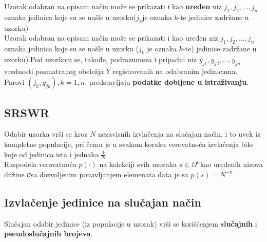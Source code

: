 \documentclass[10pt,a4paper,]{article}
\begin{document}
Uzorak odabran na opisani način može se prikazati i 
kao \textbf{uređen} niz $j_1, j_2,..., j_n$oznaka jedinica koje su se našle u 
uzorku($j_k$je oznaka $k$-te jedinice zadržane u uzorku)
\\

Uzorak odabran na opisani način može se prikazati i kao uređen niz 
$j_1,j_2,...,j_n$ oznaka jedinica koje su se našle u uzorku
($j_k$ je oznaka $k$-te) 
jedinice zadržane u uzorku).Pod uzorkom se, takođe, podrazumeva i 
pripadni niz $y_{j1},y_{j2},...,y_{jn}$vrednosti posmatranog obeležja 
$Y$ registrovanih na odabranim jedinicama.
\\

Parovi $(j_k,y_{jk}), k=\overline{1,𝑛}$, predstavljaju 
\textbf{podatke dobijene u 
istraživanju}.

\subsection{SRSWR}
\textbullet	Odabir uzorka vrši se kroz $N$ nezavisnih izvlačenja na 
slučajan način, i to uvek iz kompletne populacije, pri čemu je u 
svakom koraku verovatnoća izvlačenja bilo koje od jedinica ista i 
jednaka $\frac{1}{N}$.
\\
\textbullet 
Raspodela verovatnoća $p(\cdot)$ na kolekciji svih uzoraka
$s \in \Omega^n$kao 
uređenih 
nizova dužine 𝑛sa dozvoljenim ponavljanjem elemenata data je sa
$p(s) = N^{-n}$

\subsection{Izvlačenje jedinice na slučajan način}
Slučajan odabir jedinice (iz populacije u uzorak) vrši se korišćenjem 
\textbf{slučajnih} i \textbf{pseudoslučajnih brojeva}.
\end{document}
